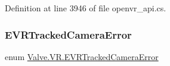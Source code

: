 Definition at line 3946 of file openvr\+\_\+api.\+cs.

\mbox{\label{namespace_valve_1_1_v_r_ad0e012e846f5d93848783c044614cfd3}} 
\subsubsection{\texorpdfstring{EVRTrackedCameraError}{EVRTrackedCameraError}}
{\footnotesize\ttfamily enum \mbox{\hyperlink{namespace_valve_1_1_v_r_ad0e012e846f5d93848783c044614cfd3}{Valve.\+V\+R.\+E\+V\+R\+Tracked\+Camera\+Error}}\hspace{0.3cm}{\ttfamily [strong]}}


